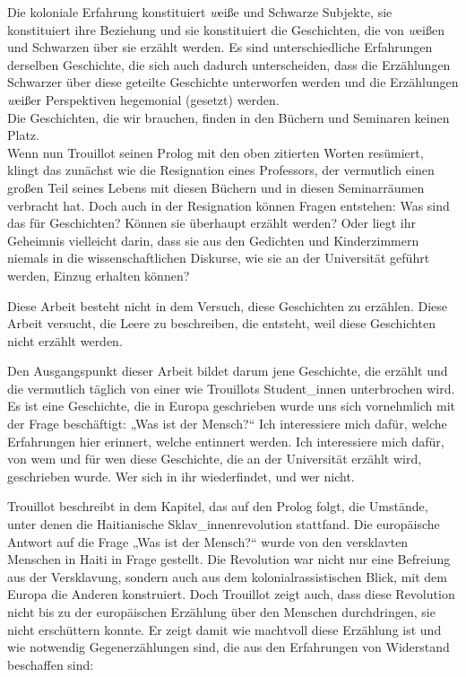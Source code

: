 Die koloniale Erfahrung konstituiert \textit{w}eiße und Schwarze Subjekte, sie
konstituiert ihre Beziehung und sie konstituiert die Geschichten, die von
\textit{w}eißen und Schwarzen über sie erzählt werden. Es sind unterschiedliche
Erfahrungen derselben Geschichte, die sich auch dadurch unterscheiden, dass die
Erzählungen Schwarzer über diese geteilte Geschichte unterworfen werden und die
Erzählungen \textit{w}eißer Perspektiven hegemonial (gesetzt) werden.\\
Die Geschichten, die wir brauchen, finden in den Büchern und Seminaren keinen
Platz.\\

Wenn nun Trouillot seinen Prolog mit den oben zitierten Worten resümiert,
klingt das zunächst wie die Resignation eines Professors, der vermutlich einen
großen Teil seines Lebens mit diesen Büchern und in diesen Seminarräumen
verbracht hat. Doch auch in der Resignation können Fragen entstehen: Was sind
das für Geschichten? Können sie überhaupt erzählt werden? Oder liegt ihr
Geheimnis vielleicht darin, dass sie aus den Gedichten und Kinderzimmern
niemals in die wissenschaftlichen Diskurse, wie sie an der Universität geführt
werden, Einzug erhalten können?

Diese Arbeit besteht nicht in dem Versuch, diese Geschichten zu erzählen. Diese
Arbeit versucht, die Leere zu beschreiben, die entsteht, weil diese Geschichten
nicht erzählt werden.

Den Ausgangspunkt dieser Arbeit bildet darum jene Geschichte, die erzählt und
die vermutlich täglich von einer wie Trouillots Student\_innen unterbrochen
wird. Es ist eine Geschichte, die in Europa geschrieben wurde uns sich
vornehmlich mit der Frage beschäftigt: „Was ist der Mensch?“ Ich interessiere
mich dafür, welche Erfahrungen hier erinnert, welche entinnert werden. Ich
interessiere mich dafür, von wem und für wen diese Geschichte, die an der
Universität erzählt wird, geschrieben wurde. Wer sich in ihr wiederfindet, und
wer nicht.

Trouillot beschreibt in dem Kapitel, das auf den Prolog folgt, die Umstände,
unter denen die Haitianische Sklav\_innenrevolution stattfand. Die europäische
Antwort auf die Frage „Was ist der Mensch?“ wurde von den versklavten Menschen
in Haiti in Frage gestellt. Die Revolution war nicht nur eine Befreiung aus der
Versklavung, sondern auch aus dem kolonialrassistischen Blick, mit dem Europa
die Anderen konstruiert. Doch Trouillot zeigt auch, dass diese Revolution nicht
bis zu der europäischen Erzählung über den Menschen durchdringen, sie nicht
erschüttern konnte. Er zeigt damit wie machtvoll diese Erzählung ist und wie
notwendig Gegenerzählungen sind, die aus den Erfahrungen von Widerstand
beschaffen sind:

